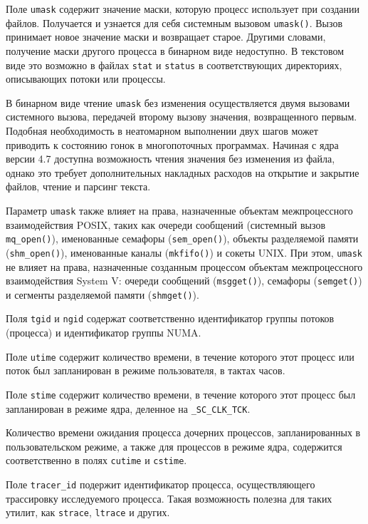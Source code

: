 Поле \texttt{umask} содержит значение маски, которую процесс использует при
создании файлов. Получается и узнается для себя системным вызовом
\texttt{umask()}. Вызов принимает новое значение маски и возвращает старое.
Другими словами, получение маски другого процесса в бинарном виде недоступно.
В текстовом виде это возможно в файлах \texttt{stat} и \texttt{status} в
соответствующих директориях, описывающих потоки или процессы.

В бинарном виде чтение \texttt{umask} без изменения осуществляется двумя
вызовами системного вызова, передачей второму вызову значения, возвращенного
первым. Подобная необходимость в неатомарном выполнении двух шагов может
приводить к состоянию гонок в многопоточных программах. Начиная с ядра версии
4.7 доступна возможность чтения значения без изменения из файла, однако это
требует дополнительных накладных расходов на открытие и закрытие файлов, чтение
и парсинг текста.

Параметр \texttt{umask} также влияет на права, назначенные объектам
межпроцессного взаимодействия POSIX, таких как очереди сообщений (системный
вызов \texttt{mq\_open()}), именованные семафоры (\texttt{sem\_open()}),
объекты разделяемой памяти (\texttt{shm\_open()}), именованные каналы
(\texttt{mkfifo()}) и сокеты UNIX. При этом, \texttt{umask} не влияет на права,
назначенные созданным процессом объектам межпроцессного взаимодействия System V:
очереди сообщений (\texttt{msgget()}), семафоры (\texttt{semget()}) и сегменты
разделяемой памяти (\texttt{shmget()}).

Поля \texttt{tgid} и \texttt{ngid} содержат соответственно идентификатор группы
потоков (процесса) и идентификатор группы NUMA.

Поле \texttt{utime} содержит количество времени, в течение которого этот процесс
или поток был запланирован в режиме пользователя, в тактах часов.

Поле \texttt{stime} содержит количество времени, в течение которого этот процесс
был запланирован в режиме ядра, деленное на \texttt{\_SC\_CLK\_TCK}.

Количество времени ожидания процесса дочерних процессов, запланированных в
пользовательском режиме, а также для процессов в режиме ядра, содержится
соответственно в полях \texttt{cutime} и \texttt{cstime}.

Поле \texttt{tracer\_id} подержит идентификатор процесса, осуществляющего
трассировку исследуемого процесса. Такая возможность полезна для таких утилит, как
\texttt{strace}, \texttt{ltrace} и других.

